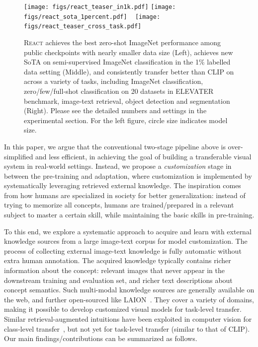 \documentclass[10pt,twocolumn,letterpaper]{article}
\newcommand{\shortname}{\textsc{React}}
\begin{document}
\begin{figure*}[t!]
	\vspace{-0mm}
	\centering
\texttt{[image: figs/react\_teaser\_in1k.pdf]}
\texttt{[image: figs/react\_sota\_1percent.pdf]} ~
\texttt{[image: figs/react\_teaser\_cross\_task.pdf]} ~
	\vspace{-2mm}
	\caption{\shortname{} achieves the best zero-shot ImageNet performance among public checkpoints  with nearly  smaller data size (Left), achieves new SoTA on semi-supervised ImageNet classification in the 1\% labelled data setting (Middle), and consistently transfer better than CLIP on across a variety of tasks, including ImageNet classification,  zero/few/full-shot classification on 20 datasets in ELEVATER benchmark, image-text retrieval, object detection and segmentation (Right). Please see the detailed numbers and settings in the experimental section. For the left figure, circle size indicates model size.}
	\vspace{-4mm}
	\label{fig:teaser}
\end{figure*}


In this paper, we argue that the conventional two-stage pipeline above is over-simplified and less efficient, in achieving the goal of building a transferable visual system in real-world settings. Instead, we propose a {\it customization} stage in between the pre-training and adaptation, where customization is implemented  by systematically leveraging retrieved external knowledge. The inspiration comes from how humans are specialized in society for better generalization: instead of trying to memorize all concepts, humans are trained/prepared in a relevant subject to master a certain skill, while maintaining the basic skills in pre-training. 

To this end, we explore a systematic approach to acquire and learn with external knowledge sources
from a large image-text corpus for model customization. The process of collecting external image-text knowledge is fully automatic without extra human annotation. The acquired knowledge typically contains richer information about the concept: relevant images that never appear in the downstream training and evaluation set, and richer text descriptions about concept semantics. Such multi-modal knowledge sources are generally available on the web, and further open-sourced like LAION~\cite{schuhmann2021laion,schuhmann2022laion}. They cover a variety of
domains, making it possible to develop customized visual models for task-level transfer. Similar retrieval-augmented intuitions have been exploited in computer vision for class-level transfer~\cite{long2022retrieval}, but not yet for task-level transfer (similar to that of CLIP).
Our main findings/contributions can be summarized as follows.
\end{document}

